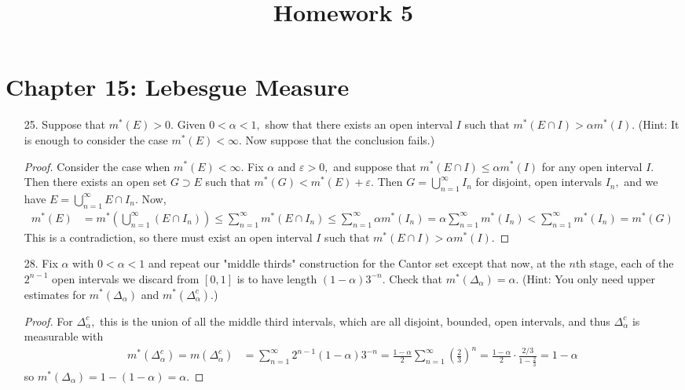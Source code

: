 \documentclass{article}
\begin{document}
\title{Homework 5}
\maketitle
\thispagestyle{fancy}

\section*{Chapter 15: Lebesgue Measure}

\begin{itemize}
	\item[25.] Suppose that $m^*(E)>0.$ Given $0<\alpha<1,$ show that there exists an open interval $I$ such that $m^*(E\cap I)>\alpha m^*(I).$ (Hint: It is enough to consider the case $m^*(E)<\infty.$ Now suppose that the conclusion fails.)
		\begin{proof}
			Consider the case when $m^*(E) < \infty.$ Fix $\alpha$ and $\varepsilon>0,$ and suppose that $m^*(E\cap I)\le \alpha m^*(I)$ for any open interval $I.$ Then there exists an open set $G\supset E$ such that $m^*(G) < m^*(E) + \varepsilon.$ Then $G=\bigcup_{n=1}^\infty I_n$ for disjoint, open intervals $I_n,$ and we have $E = \bigcup_{n=1}^\infty E\cap I_n.$ Now,
			\begin{align*}
				m^*(E) &= m^*\left( \bigcup_{n=1}^\infty (E\cap I_n) \right) \le \sum_{n=1}^\infty m^*(E\cap I_n) \le \sum_{n=1}^\infty \alpha m^*(I_n) = \alpha\sum_{n=1}^\infty m^*(I_n) < \sum_{n=1}^{\infty} m^*(I_n) = m^*(G)
			\end{align*}
			This is a contradiction, so there must exist an open interval $I$ such that $m^*(E\cap I)>\alpha m^*(I).$
		\end{proof}

	\item[28.] Fix $\alpha$ with $0<\alpha<1$ and repeat our "middle thirds" construction for the Cantor set except that now, at the $n$th stage, each of the $2^{n-1}$ open intervals we discard from $[0, 1]$ is to have length $(1-\alpha)3^{-n}.$ Check that $m^*(\Delta_\alpha)=\alpha.$ (Hint: You only need upper estimates for $m^*(\Delta_\alpha)$ and $m^*(\Delta_\alpha^c).$)
		\begin{proof}
			For $\Delta_\alpha^c,$ this is the union of all the middle third intervals, which are all disjoint, bounded, open intervals, and thus $\Delta_\alpha^c$ is measurable with
			\begin{align*}
				m^*(\Delta_\alpha^c) = m(\Delta_\alpha^c) &= \sum_{n=1}^{\infty} 2^{n-1} (1-\alpha)3^{-n} = \frac{1-\alpha}{2}\sum_{n=1}^{\infty} \left( \frac{2}{3} \right)^n = \frac{1-\alpha}{2} \cdot \frac{2/3}{1-\frac{2}{3}} = 1-\alpha
			\end{align*}
			so $m^*(\Delta_\alpha) = 1-(1-\alpha) = \alpha.$
		\end{proof}


\end{itemize}
\end{document}
